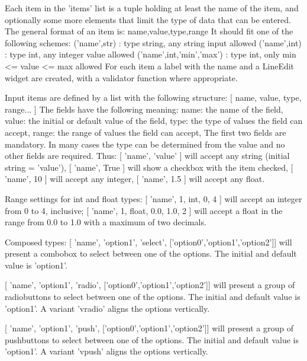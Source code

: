         Each item in the 'items' list is a tuple holding at least the name
        of the item, and optionally some more elements that limit the type
        of data that can be entered. The general format of an item is:
          name,value,type,range
        It should fit one of the following schemes:
        ('name',str) : type string, any string input allowed
        ('name',int) : type int, any integer value allowed
        ('name',int,'min','max') : type int, only min <= value <= max allowed
        For each item a label with the name and a LineEdit widget are created,
        with a validator function where appropriate.

        Input items are defined by a list with the following structure:
        [ name, value, type, range... ]
        The fields have the following meaning:
          name:  the name of the field,
          value: the initial or default value of the field,
          type:  the type of values the field can accept,
          range: the range of values the field can accept,
        The first two fields are mandatory. In many cases the type can be
        determined from the value and no other fields are required. Thus:
        [ 'name', 'value' ] will accept any string (initial string = 'value'),
        [ 'name', True ] will show a checkbox with the item checked,
        [ 'name', 10 ] will accept any integer,
        [ 'name', 1.5 ] will accept any float.

        Range settings for int and float types:
        [ 'name', 1, int, 0, 4 ] will accept an integer from 0 to 4, inclusive;
        [ 'name', 1, float, 0.0, 1.0, 2 ] will accept a float in the range
           from 0.0 to 1.0 with a maximum of two decimals.

        Composed types:
        [ 'name', 'option1', 'select', ['option0','option1','option2']] will
        present a combobox to select between one of the options.
        The initial and default value is 'option1'.

        [ 'name', 'option1', 'radio', ['option0','option1','option2']] will
        present a group of radiobuttons to select between one of the options.
        The initial and default value is 'option1'.
        A variant 'vradio' aligns the options vertically. 
        
        [ 'name', 'option1', 'push', ['option0','option1','option2']] will
        present a group of pushbuttons to select between one of the options.
        The initial and default value is 'option1'.
        A variant 'vpush' aligns the options vertically. 

